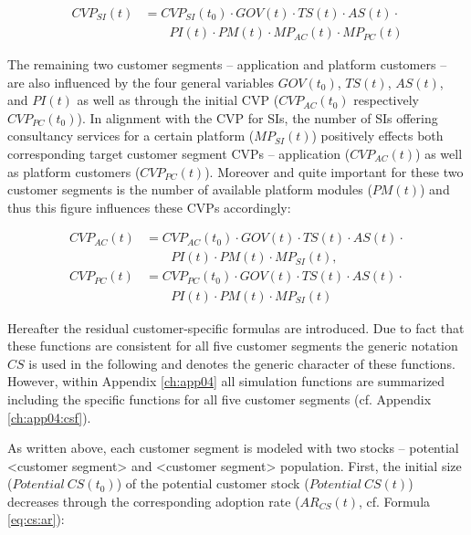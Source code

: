 \begin{align}
		CVP_{SI}(t) &= CVP_{SI}(t_0) \cdot GOV(t) \cdot TS(t) \cdot AS(t) \cdot \nonumber \\ &\qquad PI(t) \cdot PM(t) \cdot MP_{AC}(t) \cdot MP_{PC}(t)\label{eq:cvp:si}
\end{align}

The remaining two customer segments -- application and platform customers -- are also influenced by the four general variables $GOV(t_0)$, $TS(t)$, $AS(t)$, and $PI(t)$ as well as through the initial \ac{CVP} ($CVP_{AC}(t_0)$ respectively $CVP_{PC}(t_0)$). In alignment with the \ac{CVP} for \acp{SI}, the number of \acp{SI} offering consultancy services for a certain platform ($MP_{SI}(t)$) positively effects both corresponding target customer segment \acp{CVP} -- application ($CVP_{AC}(t)$) as well as platform customers ($CVP_{PC}(t)$). Moreover and quite important for these two customer segments is the number of available platform modules ($PM(t)$) and thus this figure influences these \acp{CVP} accordingly:

\begin{align}
		CVP_{AC}(t) &= CVP_{AC}(t_0) \cdot GOV(t) \cdot TS(t) \cdot AS(t) \cdot \nonumber \\ &\qquad PI(t) \cdot PM(t) \cdot MP_{SI}(t),\label{eq:cvp:ac}\\
		CVP_ {PC}(t) &= CVP_{PC}(t_0) \cdot GOV(t) \cdot TS(t) \cdot AS(t) \cdot \nonumber \\ &\qquad PI(t) \cdot PM(t) \cdot MP_{SI}(t)\label{eq:cvp:pc}
\end{align}

Hereafter the residual customer-specific formulas are introduced. Due to fact that these functions are consistent for all five customer segments the generic notation $CS$ is used in the following and denotes the generic character of these functions. However, within Appendix \ref{ch:app04} all simulation functions are summarized including the specific functions for all five customer segments (cf. Appendix \ref{ch:app04:csf}).

As written above, each customer segment is modeled with two stocks -- potential <customer segment> and <customer segment> population. First, the initial size ($\mathit{Potential~CS(t_0)}$) of the potential customer stock \linebreak ($\mathit{Potential~CS(t)}$) decreases through the corresponding adoption rate \linebreak ($AR_{CS}(t)$, cf. Formula \ref{eq:cs:ar}):

